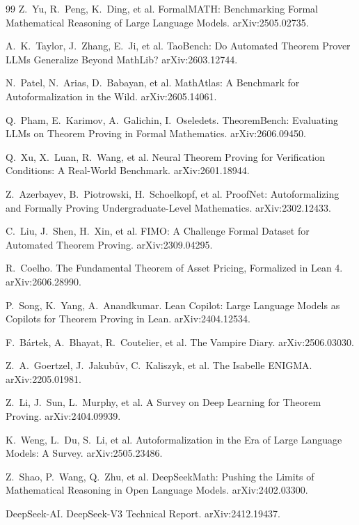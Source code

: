 \documentclass[UTF8,a4paper,11pt,fontset=windows]{ctexart}
\begin{document}
\begin{thebibliography}{99}
 Z.~Yu, R.~Peng, K.~Ding, et al. FormalMATH: Benchmarking Formal Mathematical Reasoning of Large Language Models. arXiv:2505.02735.

 A.~K.~Taylor, J.~Zhang, E.~Ji, et al. TaoBench: Do Automated Theorem Prover LLMs Generalize Beyond MathLib? arXiv:2603.12744.

 N.~Patel, N.~Arias, D.~Babayan, et al. MathAtlas: A Benchmark for Autoformalization in the Wild. arXiv:2605.14061.

 Q.~Pham, E.~Karimov, A.~Galichin, I.~Oseledets. TheoremBench: Evaluating LLMs on Theorem Proving in Formal Mathematics. arXiv:2606.09450.

 Q.~Xu, X.~Luan, R.~Wang, et al. Neural Theorem Proving for Verification Conditions: A Real-World Benchmark. arXiv:2601.18944.

 Z.~Azerbayev, B.~Piotrowski, H.~Schoelkopf, et al. ProofNet: Autoformalizing and Formally Proving Undergraduate-Level Mathematics. arXiv:2302.12433.

 C.~Liu, J.~Shen, H.~Xin, et al. FIMO: A Challenge Formal Dataset for Automated Theorem Proving. arXiv:2309.04295.

 R.~Coelho. The Fundamental Theorem of Asset Pricing, Formalized in Lean 4. arXiv:2606.28990.

 P.~Song, K.~Yang, A.~Anandkumar. Lean Copilot: Large Language Models as Copilots for Theorem Proving in Lean. arXiv:2404.12534.

 F.~B\'artek, A.~Bhayat, R.~Coutelier, et al. The Vampire Diary. arXiv:2506.03030.

 Z.~A.~Goertzel, J.~Jakub\r{u}v, C.~Kaliszyk, et al. The Isabelle ENIGMA. arXiv:2205.01981.

 Z.~Li, J.~Sun, L.~Murphy, et al. A Survey on Deep Learning for Theorem Proving. arXiv:2404.09939.

 K.~Weng, L.~Du, S.~Li, et al. Autoformalization in the Era of Large Language Models: A Survey. arXiv:2505.23486.

 Z.~Shao, P.~Wang, Q.~Zhu, et al. DeepSeekMath: Pushing the Limits of Mathematical Reasoning in Open Language Models. arXiv:2402.03300.

 DeepSeek-AI. DeepSeek-V3 Technical Report. arXiv:2412.19437.


\end{thebibliography}
\end{document}

